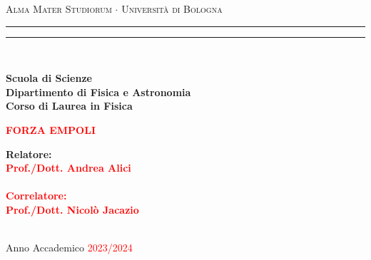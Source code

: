 \documentclass[12pt,a4paper]{report}
\begin{document}
\begin{titlepage}

\begin{center}
{{\Large{\textsc{Alma Mater Studiorum $\cdot$ Universit\`a di Bologna}}}} 
\rule[0.1cm]{15.8cm}{0.1mm}
\rule[0.5cm]{15.8cm}{0.6mm}
\\ \vspace{3mm}

{\small{\bf Scuola di Scienze \\ 
Dipartimento di Fisica e Astronomia\\
Corso di Laurea in Fisica}}

\end{center}

\vspace{23mm}

\begin{center}\textcolor{red}{
%
%
{\LARGE{\bf FORZA EMPOLI}}\\
}\end{center}

\vspace{50mm} \par \noindent

\begin{minipage}[t]{0.47\textwidth}
%
%
{\large{\bf Relatore: \vspace{2mm}\\\textcolor{red}{
Prof./Dott. Andrea Alici}\\\\
%
%
%
\textcolor{red}{
\bf Correlatore:
\vspace{2mm}\\
Prof./Dott. Nicolò Jacazio\\\\}}}
\end{minipage}
%
\hfill
%
\begin{minipage}[t]{0.47\textwidth}
\end{minipage}

\vspace{40mm}

\begin{center}
Anno Accademico \textcolor{red}{ 2023/2024}
\end{center}

\end{titlepage}
\end{document}
